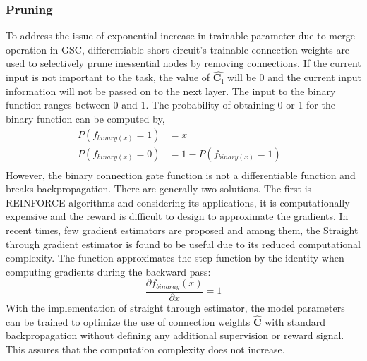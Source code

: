 \documentclass{article}
\let\oldhat\hat
\renewcommand{\hat}[1]{\oldhat{\mathbf{#1}}}
\begin{document}
\subsubsection{Pruning}
\label{sec:Pruning}
To address the issue of exponential increase in trainable parameter due to merge operation in GSC, differentiable short circuit's trainable connection weights are used to selectively prune inessential nodes by removing connections.  If the current input is not important to the task, the value of $\hat{C_{i}}$ will be 0 and the current input information will not be passed on to the next layer. The input to the binary function ranges between 0 and 1. The probability of obtaining 0 or 1 for the binary function can be computed by,
\begin{equation}
\label{eq:ffn_math_representation}
\begin{aligned}
   P(f_{binary(x)}=1) &=x&\\
   P(f_{binary(x)}=0) &=1-P(f_{binary(x)}=1)&\\   
\end{aligned}
\end{equation}
However, the binary connection gate function is not a differentiable function and breaks backpropagation. There are generally two solutions. The first is REINFORCE algorithms \cite{Williams1992SimpleSG} and considering its applications, it is computationally expensive and the reward is difficult to design to approximate the gradients. In recent times, few gradient estimators are proposed and among them, the Straight through gradient estimator \cite{Bengio2013EstimatingOP} is found to be useful due to its reduced computational complexity. The function approximates the step function by the identity when computing gradients during the backward pass:
\begin{equation}
\frac{\partial{f_{binaray}(x)}}{\partial x}=1
\end{equation}
With the implementation of straight through estimator, the model parameters can be trained to optimize the use of connection weights $\hat{C}$ with standard backpropagation without defining any additional supervision or reward signal. This assures that the computation complexity does not increase.
\end{document}
